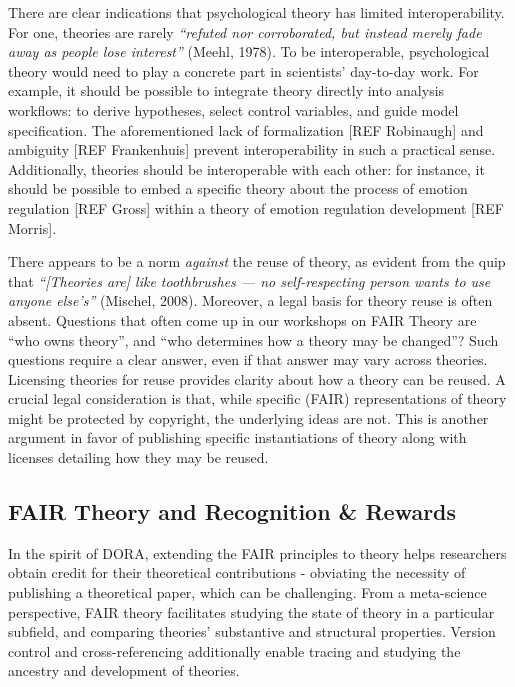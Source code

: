 \documentclass[
  man]{apa6}
\begin{document}
There are clear indications that psychological theory has limited interoperability.
For one, theories are rarely \emph{``refuted nor corroborated, but instead merely fade away as people lose interest''} (Meehl, 1978).
To be interoperable, psychological theory would need to play a concrete part in scientists' day-to-day work.
For example, it should be possible to integrate theory directly into analysis workflows:
to derive hypotheses, select control variables, and guide model specification.
The aforementioned lack of formalization {[}REF Robinaugh{]} and ambiguity {[}REF Frankenhuis{]} prevent interoperability in such a practical sense.
Additionally, theories should be interoperable with each other:
for instance, it should be possible to embed a specific theory about the process of emotion regulation {[}REF Gross{]} within a theory of emotion regulation development {[}REF Morris{]}.

There appears to be a norm \emph{against} the reuse of theory,
as evident from the quip that
\emph{``{[}Theories are{]} like toothbrushes --- no self-respecting person wants to use anyone else's''} (Mischel, 2008).
Moreover, a legal basis for theory reuse is often absent.
Questions that often come up in our workshops on FAIR Theory are ``who owns theory'',
and ``who determines how a theory may be changed''?
Such questions require a clear answer, even if that answer may vary across theories.
Licensing theories for reuse provides clarity about how a theory can be reused.
A crucial legal consideration is that,
while specific (FAIR) representations of theory might be protected by copyright,
the underlying ideas are not.
This is another argument in favor of publishing specific instantiations of theory along with licenses detailing how they may be reused.

\subsection{FAIR Theory and Recognition \& Rewards}\label{fair-theory-and-recognition-rewards}

In the spirit of DORA, extending the FAIR principles to theory helps researchers obtain credit for their theoretical contributions - obviating the necessity of publishing a theoretical paper, which can be challenging.
From a meta-science perspective, FAIR theory facilitates studying the state of theory in a particular subfield, and comparing theories' substantive and structural properties. Version control and cross-referencing additionally enable tracing and studying the ancestry and development of theories.
\end{document}
